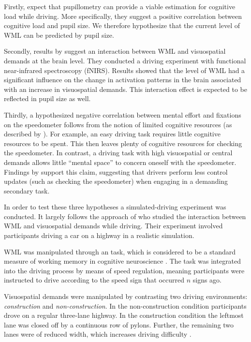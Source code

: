 Firstly, \citet{Palinko2010} expect that pupillometry can provide a viable estimation for cognitive load while driving. 
More specifically, they suggest a positive correlation between cognitive load and pupil size.
We therefore hypothesize that the current level of WML can be predicted by pupil size.

Secondly, results by \citet{Scheunemann2019} suggest an interaction between WML and visuospatial demands at the brain level. 
They conducted a driving experiment with functional near-infrared spectroscopy (fNIRS).
Results showed that the level of WML had a significant influence on the change in activation patterns in the brain associated with an increase in visuospatial demands.
This interaction effect is expected to be reflected in pupil size as well.

Thirdly, a hypothesized negative correlation between mental effort and fixations on the speedometer follows from the notion of limited cognitive resources (as described by \citet{DeWaard1996}).
For example, an easy driving task requires little cognitive resources to be spent.
This then leaves plenty of cognitive resources for checking the speedometer.
In contrast, a driving task with high visuospatial or central demands allows little ``mental space'' to concern oneself with the speedometer.
Findings by \citet{Salvucci2011} support this claim, suggesting that drivers perform less control updates (such as checking the speedometer) when engaging in a demanding secondary task.

In order to test these three hypotheses a simulated-driving experiment was conducted.
It largely follows the approach of \citet{Scheunemann2019} who studied the interaction between WML and visuospatial demands while driving.
Their experiment involved participants driving a car on a highway in a realistic simulation. 

WML was manipulated through an \nback task, which is considered to be a standard measure of working memory in cognitive neuroscience \citep{Kane2007}.
The task was integrated into the driving process by means of speed regulation, meaning participants were instructed to drive according to the speed sign that occurred \(n\) signs ago.

Visuospatial demands were manipulated by contrasting two driving environments: \textit{construction} and \textit{non-construction}.
In the non-construction condition participants drove on a regular three-lane highway.
In the construction condition the leftmost lane was closed off by a continuous row of pylons.
Further, the remaining two lanes were of reduced width, which increases driving difficulty \citep{Liu2016}.